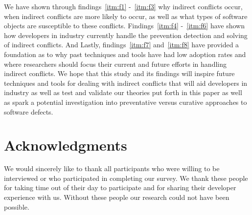 \documentclass[conference]{IEEEtran}
\begin{document}
We have shown through findings~\ref{itm:f1} -~\ref{itm:f3} why indirect conflicts occur, when indirect conflicts are more likely to
occur, as well as what types of software objects are susceptible to these conflicts. Findings~\ref{itm:f4} -~\ref{itm:f6} have shown
how developers in industry currently handle the prevention detection and solving of indirect conflicts. And Lastly, findings~\ref{itm:f7} 
and~\ref{itm:f8} have provided a foundation as to why past techniques and tools have had low adoption rates and where
researchers should focus their current and future efforts in handling indirect conflicts. We hope that this study and its 
findings will inspire future techniques and tools for dealing with indirect conflicts that 
will aid developers in industry as well as test and validate our theories put forth in this paper as well as spark a potential
investigation into preventative versus curative approaches to software defects.

\section{Acknowledgments}

We would sincerely like to thank all participants who were willing to be interviewed or who participated
in completing our survey. We thank these people for taking time out of their day to participate and for
sharing their developer experience with us. Without these people our research could not have been possible.




\end{document}
